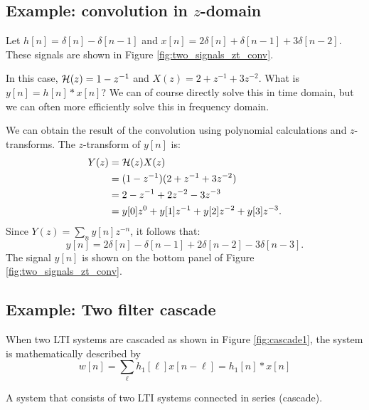 \subsection{Example: convolution in $z$-domain}

Let $h[n] = \delta[n] - \delta[n-1]$ and $x[n]=2\delta[n]+\delta[n-1]+3\delta[n-2]$.
These signals are shown in Figure \ref{fig:two_signals_zt_conv}.

In this case, $\mathcal{H}(z) = 1 - z^{-1}$ and $X(z)=2+z^{-1}+3z^{-2}$. What is
$y[n]=h[n]*x[n]$? We can of course directly solve this in time domain,
but we can often more efficiently solve this in frequency domain.

We can obtain the result of the convolution using polynomial calculations
and $z$-transforms. The $z$-transform of $y[n]$ is:
\begin{align}
  Y(z) & = \mathcal{H}(z) X(z)                                     \\
       & = (1-z^{-1})(2+z^{-1}+3z^{-2})                  \\
       & = 2 - z^{-1} + 2z^{-2} - 3 z^{-3}               \\
       & =y[0]z^0 +y[1] z^{-1} + y[2]z^{-2} +y[3]z^{-3}.
\end{align}
Since $Y(z)=\sum_n y[n] z^{-n}$, it follows that:
\begin{equation}
  y[n]=2\delta[n]-\delta[n-1]+2\delta[n-2]-3\delta[n-3].
\end{equation}
The signal $y[n]$ is shown on the bottom panel of Figure \ref{fig:two_signals_zt_conv}.

\subsection{Example: Two filter cascade}

When two LTI systems are cascaded as shown in Figure
\ref{fig:cascade1}, the system is mathematically described by
\begin{equation}
  w[n] = \sum_{\ell} h_1[\ell]x[n-\ell] = h_1[n]*x[n]
\end{equation}

\begin{marginfigure}
  \begin{center}
  \end{center}
  \caption{A system that consists of two LTI systems connected in series (cascade).}
  \label{fig:cascade1}
\end{marginfigure}

